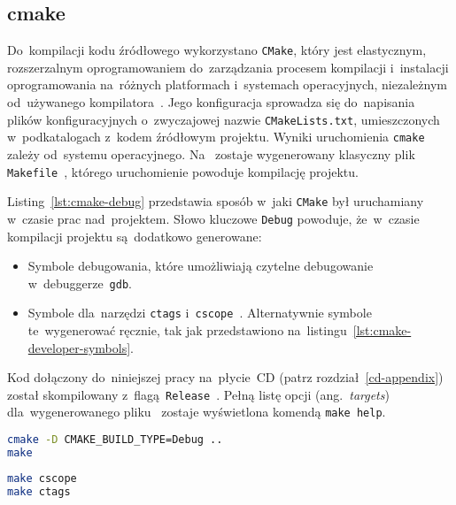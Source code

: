 \documentclass[thesis]{subfiles}
\begin{document}

\subsection{cmake}

Do~kompilacji kodu źródłowego wykorzystano \texttt{CMake}, który jest elastycznym, rozszerzalnym oprogramowaniem do~zarządzania procesem kompilacji i~instalacji oprogramowania na~różnych platformach i~systemach operacyjnych, niezależnym od~używanego kompilatora~\cite{cmake}. Jego konfiguracja sprowadza się do~napisania plików konfiguracyjnych o~zwyczajowej nazwie \mbox{\texttt{CMakeLists.txt}}, umieszczonych w~podkatalogach z~kodem źródłowym projektu. Wyniki uruchomienia \texttt{cmake} zależy od~systemu operacyjnego. Na~ zostaje wygenerowany klasyczny plik \texttt{Makefile}~\cite{gnu-makefile-manual}, którego uruchomienie powoduje kompilację projektu.

Listing~\ref{lst:cmake-debug} przedstawia sposób w~jaki \texttt{CMake} był uruchamiany w~czasie prac nad~projektem. Słowo kluczowe \texttt{Debug} powoduje, że~w~czasie kompilacji projektu są~dodatkowo generowane:
\begin{itemize}
\item Symbole debugowania, które umożliwiają czytelne debugowanie w~debuggerze~\texttt{gdb}.
\item Symbole dla~narzędzi \texttt{ctags} i~\texttt{cscope}~\cite{ctags,cscope}. Alternatywnie symbole te~wygenerować ręcznie, tak jak przedstawiono na~listingu~\ref{lst:cmake-developer-symbols}.
\end{itemize}
Kod dołączony do~niniejszej pracy na~płycie~CD (patrz rozdział~\ref{cd-appendix}) został skompilowany z~flagą~\texttt{Release}~\cite{cmake-compilation-type-manual,cmake-compilation-type-stackoverflow}. Pełną listę opcji (ang.~\emph{targets}) dla~wygenerowanego pliku~ zostaje wyświetlona komendą \texttt{make~help}.

\begin{lstlisting}[label=lst:cmake-debug,language=bash,numbers=none,caption={Uruchomienie \texttt{cmake} w~trybie \texttt{Debug}}]
cmake -D CMAKE_BUILD_TYPE=Debug ..
make
\end{lstlisting}

\begin{lstlisting}[label=lst:cmake-developer-symbols,language=bash,numbers=none,caption={Generowanie symboli dla~narzędzi \texttt{cscope} i~\texttt{ctags}}]
make cscope
make ctags
\end{lstlisting}
\end{document}

